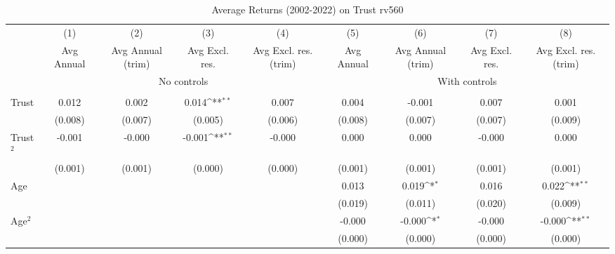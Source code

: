 \begin{table}[htbp]\centering
\def\sym#1{\ifmmode^{#1}\else\(^{#1}\)\fi}
\caption{Average Returns (2002-2022) on Trust rv560}
\begin{tabular}{l*{8}{c}}
\toprule
          &\multicolumn{1}{c}{(1)}&\multicolumn{1}{c}{(2)}&\multicolumn{1}{c}{(3)}&\multicolumn{1}{c}{(4)}&\multicolumn{1}{c}{(5)}&\multicolumn{1}{c}{(6)}&\multicolumn{1}{c}{(7)}&\multicolumn{1}{c}{(8)}\\
          &\multicolumn{1}{c}{Avg Annual}&\multicolumn{1}{c}{Avg Annual (trim)}&\multicolumn{1}{c}{Avg Excl. res.}&\multicolumn{1}{c}{Avg Excl. res. (trim)}&\multicolumn{1}{c}{Avg Annual}&\multicolumn{1}{c}{Avg Annual (trim)}&\multicolumn{1}{c}{Avg Excl. res.}&\multicolumn{1}{c}{Avg Excl. res. (trim)}\\
& \multicolumn{4}{c}{No controls} & \multicolumn{4}{c}{With controls} \\\\ \cmidrule(lr){2-5}\cmidrule(lr){6-9}
Trust     &    0.012         &    0.002         &    0.014\sym{**} &    0.007         &    0.004         &   -0.001         &    0.007         &    0.001         \\
          &  (0.008)         &  (0.007)         &  (0.005)         &  (0.006)         &  (0.008)         &  (0.007)         &  (0.007)         &  (0.009)         \\
Trust$^{2}$&   -0.001         &   -0.000         &   -0.001\sym{**} &   -0.000         &    0.000         &    0.000         &   -0.000         &    0.000         \\
          &  (0.001)         &  (0.001)         &  (0.000)         &  (0.000)         &  (0.001)         &  (0.001)         &  (0.001)         &  (0.001)         \\
Age       &                  &                  &                  &                  &    0.013         &    0.019\sym{*}  &    0.016         &    0.022\sym{**} \\
          &                  &                  &                  &                  &  (0.019)         &  (0.011)         &  (0.020)         &  (0.009)         \\
Age$^{2}$ &                  &                  &                  &                  &   -0.000         &   -0.000\sym{*}  &   -0.000         &   -0.000\sym{**} \\
          &                  &                  &                  &                  &  (0.000)         &  (0.000)         &  (0.000)         &  (0.000)         \\

\end{tabular}
\end{table}
